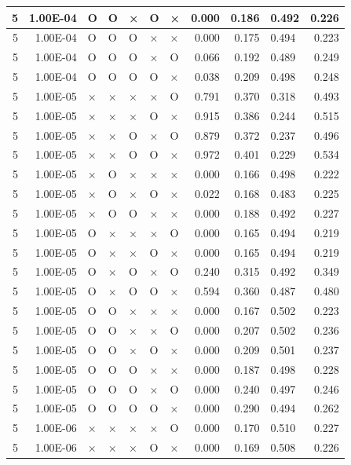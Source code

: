\documentclass[11pt]{article}
\begin{document}
\begin{longtable}[h]{|r|r|l|l|l|l|l|r|r|l|r|}
5 & 1.00E-04 & O & O & × & O & × & 0.000 & 0.186 & 0.492 & 0.226 \\ \hline
5 & 1.00E-04 & O & O & O & × & × & 0.000 & 0.175 & 0.494 & 0.223 \\ \hline
5 & 1.00E-04 & O & O & O & × & O & 0.066 & 0.192 & 0.489 & 0.249 \\ \hline
5 & 1.00E-04 & O & O & O & O & × & 0.038 & 0.209 & 0.498 & 0.248 \\ \hline
5 & 1.00E-05 & × & × & × & × & O & 0.791 & 0.370 & 0.318 & 0.493 \\ \hline
5 & 1.00E-05 & × & × & × & O & × & 0.915 & 0.386 & 0.244 & 0.515 \\ \hline
5 & 1.00E-05 & × & × & O & × & O & 0.879 & 0.372 & 0.237 & 0.496 \\ \hline
5 & 1.00E-05 & × & × & O & O & × & 0.972 & 0.401 & 0.229 & 0.534 \\ \hline
5 & 1.00E-05 & × & O & × & × & × & 0.000 & 0.166 & 0.498 & 0.222 \\ \hline
5 & 1.00E-05 & × & O & × & O & × & 0.022 & 0.168 & 0.483 & 0.225 \\ \hline
5 & 1.00E-05 & × & O & O & × & × & 0.000 & 0.188 & 0.492 & 0.227 \\ \hline
5 & 1.00E-05 & O & × & × & × & O & 0.000 & 0.165 & 0.494 & 0.219 \\ \hline
5 & 1.00E-05 & O & × & × & O & × & 0.000 & 0.165 & 0.494 & 0.219 \\ \hline
5 & 1.00E-05 & O & × & O & × & O & 0.240 & 0.315 & 0.492 & 0.349 \\ \hline
5 & 1.00E-05 & O & × & O & O & × & 0.594 & 0.360 & 0.487 & 0.480 \\ \hline
5 & 1.00E-05 & O & O & × & × & × & 0.000 & 0.167 & 0.502 & 0.223 \\ \hline
5 & 1.00E-05 & O & O & × & × & O & 0.000 & 0.207 & 0.502 & 0.236 \\ \hline
5 & 1.00E-05 & O & O & × & O & × & 0.000 & 0.209 & 0.501 & 0.237 \\ \hline
5 & 1.00E-05 & O & O & O & × & × & 0.000 & 0.187 & 0.498 & 0.228 \\ \hline
5 & 1.00E-05 & O & O & O & × & O & 0.000 & 0.240 & 0.497 & 0.246 \\ \hline
5 & 1.00E-05 & O & O & O & O & × & 0.000 & 0.290 & 0.494 & 0.262 \\ \hline
5 & 1.00E-06 & × & × & × & × & O & 0.000 & 0.170 & 0.510 & 0.227 \\ \hline
5 & 1.00E-06 & × & × & × & O & × & 0.000 & 0.169 & 0.508 & 0.226 \\ \hline

\end{longtable}
\end{document}
